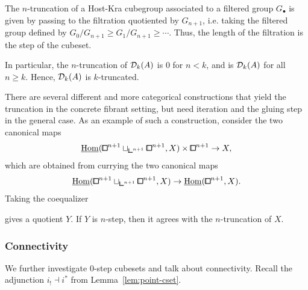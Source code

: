 \begin{example}\label{ex:truncation_HK}
The $n$-truncation of a Host-Kra cubegroup associated to a filtered group $G_\bullet$ is given by passing to the filtration quotiented by $G_{n+1}$,
i.e. taking the filtered group defined by $G_0/G_{n+1}\ge G_1/G_{n+1}\ge\cdots$.
Thus, the length of the filtration is the step of the cubeset.

In particular, the $n$-truncation of $\mathcal{D}_k(A)$ is $0$ for $n< k$,
and is $\mathcal{D}_k(A)$ for all $n\ge k$.
Hence, $\mathcal{D}_k(A)$ is $k$-truncated.
\end{example}

\begin{remark}
There are several different and more categorical constructions that yield the truncation in the concrete fibrant setting, but need iteration and the gluing step in the general case.
As an example of such a construction, consider the two canonical maps
\[
    \ihom({\bbox}^{n+1}\sqcup_{{\bbcor}^{n+1}}{\bbox}^{n+1},X)\times{\bbox}^{n+1}\to X,
\]
which are obtained from currying the two canonical maps
\[
    \ihom({\bbox}^{n+1}\sqcup_{{\bbcor}^{n+1}}{\bbox}^{n+1},X)\to \ihom({\bbox}^{n+1},X).
\]
Taking the coequalizer
\begin{center}
\end{center}
gives a quotient $Y$.
If $Y$ is $n$-step, then it agrees with the $n$-truncation of $X$.
\end{remark}

\subsubsection{Connectivity}\label{ssec:connectivity}

We further investigate $0$-step cubesets and talk about connectivity.
Recall the adjunction $i_!\dashv i^\ast$ from Lemma~\ref{lem:point-cset}.

